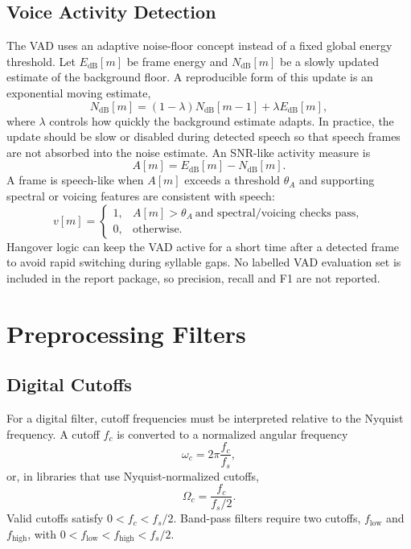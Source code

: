﻿\documentclass[11pt,a4paper]{article}
\begin{document}
\subsection{Voice Activity Detection}
The VAD uses an adaptive noise-floor concept instead of a fixed global energy threshold. Let $E_{\mathrm{dB}}[m]$ be frame energy and $N_{\mathrm{dB}}[m]$ be a slowly updated estimate of the background floor. A reproducible form of this update is an exponential moving estimate,
\begin{equation}
    N_{\mathrm{dB}}[m] = (1-\lambda)N_{\mathrm{dB}}[m-1] + \lambda E_{\mathrm{dB}}[m],
\end{equation}
where $\lambda$ controls how quickly the background estimate adapts. In practice, the update should be slow or disabled during detected speech so that speech frames are not absorbed into the noise estimate. An SNR-like activity measure is
\begin{equation}
    A[m] = E_{\mathrm{dB}}[m] - N_{\mathrm{dB}}[m].
\end{equation}
A frame is speech-like when $A[m]$ exceeds a threshold $\theta_A$ and supporting spectral or voicing features are consistent with speech:
\begin{equation}
    v[m] =
    \begin{cases}
    1, & A[m] > \theta_A \ \text{and spectral/voicing checks pass},\\
    0, & \text{otherwise}.
    \end{cases}
\end{equation}
Hangover logic can keep the VAD active for a short time after a detected frame to avoid rapid switching during syllable gaps. No labelled VAD evaluation set is included in the report package, so precision, recall and F1 are not reported.

\section{Preprocessing Filters}
\subsection{Digital Cutoffs}
For a digital filter, cutoff frequencies must be interpreted relative to the Nyquist frequency. A cutoff $f_c$ is converted to a normalized angular frequency
\begin{equation}
    \omega_c = 2\pi\frac{f_c}{f_s},
\end{equation}
or, in libraries that use Nyquist-normalized cutoffs,
\begin{equation}
    \Omega_c = \frac{f_c}{f_s/2}.
\end{equation}
Valid cutoffs satisfy $0 < f_c < f_s/2$. Band-pass filters require two cutoffs, $f_{\mathrm{low}}$ and $f_{\mathrm{high}}$, with $0 < f_{\mathrm{low}} < f_{\mathrm{high}} < f_s/2$.
\end{document}
